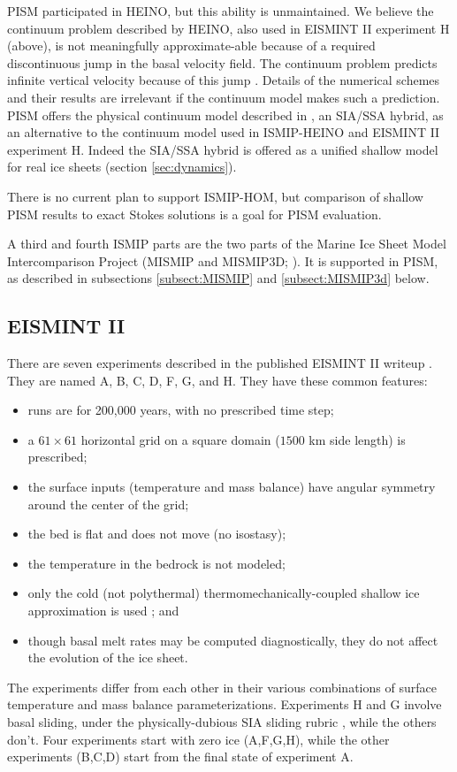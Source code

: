 PISM participated in HEINO, but this ability is unmaintained.   We believe the continuum problem described by HEINO, also used in EISMINT II experiment H (above), is not meaningfully approximate-able because of a required discontinuous jump in the basal velocity field.  The continuum problem predicts infinite vertical velocity because of this jump \cite[Appendix B]{BBssasliding}.  Details of the numerical schemes and their results are irrelevant if the continuum model makes such a prediction.  PISM offers the physical continuum model described in \cite{BBssasliding}, an SIA/SSA hybrid, as an alternative to the continuum model used in ISMIP-HEINO and EISMINT II experiment H.  Indeed the SIA/SSA hybrid is offered as a unified shallow model for real ice sheets (section \ref{sec:dynamics}).

There is no current plan to support ISMIP-HOM, but comparison of shallow PISM results to exact Stokes solutions is a goal for PISM evaluation.

A third and fourth ISMIP parts are the two parts of the Marine Ice Sheet Model Intercomparison Project (MISMIP and MISMIP3D; \cite{MISMIP2012,MISMIP3d2013}).  It is supported in PISM, as described in subsections \ref{subsect:MISMIP} and \ref{subsect:MISMIP3d} below.


\subsection{EISMINT II}\label{subsect:EISMINTII}

There are seven experiments described in the published EISMINT II writeup \cite{EISMINT00}.  They are named A, B, C, D, F, G, and H.  They have these common features:\begin{itemize}
\item runs are for 200,000 years, with no prescribed time step;
\item a $61\times 61$ horizontal grid on a square domain ($1500$ km side length) is prescribed;
\item the surface inputs (temperature and mass balance) have angular symmetry around the center of the grid;
\item the bed is flat and does not move (no isostasy);
\item the temperature in the bedrock is not modeled;
\item only the cold (not polythermal) thermomechanically-coupled shallow ice approximation is used \cite{EISMINT00}; and
\item though basal melt rates may be computed diagnostically, they do not affect the evolution of the ice sheet.
\end{itemize}
The experiments differ from each other in their various combinations of surface temperature and mass balance parameterizations.  Experiments H and G involve basal sliding, under the physically-dubious SIA sliding rubric \cite[Appendix B]{BBssasliding}, while the others don't.  Four experiments start with zero ice (A,F,G,H), while the other experiments (B,C,D) start from the final state of experiment A.

